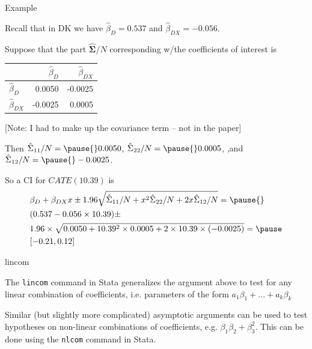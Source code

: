 \documentclass[11pt,english,handout]{beamer}
\newenvironment{wideitemize}{\itemize\addtolength{\itemsep}{10pt}}{\enditemize}
\begin{document}
\begin{frame}{Example}
\begin{wideitemize}
\item
Recall that in DK we have $\hat\beta_D = 0.537$ and $\hat\beta_{DX} = -0.056$.

\item
Suppose that the part $\bm{\hat\Sigma}/N$ corresponding w/the coefficients of interest is

\begin{tabular}{l|rr}
& $\hat\beta_{D}$ & $\hat\beta_{DX}$ \\ \hline 
$\hat\beta_{D}$  & 0.0050  & -0.0025 \\
$\hat\beta_{DX}$ & -0.0025 & 0.0005
\end{tabular}
 
[Note: I had to make up the covariance term -- not in the paper] 
 
 \pause
 \item
 Then $\hat\Sigma_{11}/N = \pause{} 0.0050$, \pause $\hat\Sigma_{22}/N = \pause{} 0.0005$, \pause ,and $\hat\Sigma_{12}/N = \pause{} -0.0025$.
 
 \pause
 \item
 So a CI for $CATE(10.39)$ is \pause{}
\begin{align*}
&\beta_{D} + \beta_{DX} x \pm  1.96 \sqrt{ \hat\Sigma_{11}/N + x^2 \hat\Sigma_{22}/N +   2x \hat\Sigma_{12}/N } = \pause{} \\
&(0.537-0.056 \times 10.39) \pm \\ &1.96 \times \sqrt{  0.0050 + 10.39^2 \times 0.0005 + 2 \times 10.39 \times (-0.0025)  } = \pause \\
&[-0.21, 0.12]
\end{align*} 
 
\end{wideitemize}	
	
\end{frame}


\begin{frame}{lincom}
	\begin{wideitemize}
		\item
		The \texttt{lincom} command in Stata generalizes the argument above to test for any linear combination of coefficients, i.e. parameters of the form $a_1 \beta_1 + ...+ a_k \beta_k$
		

		\pause
		\item
		Similar (but slightly more complicated) asymptotic arguments can be used to test hypotheses on non-linear combinations of coefficients, e.g. $\beta_1 \beta_2 + \beta_3^2$. This can be done using the \texttt{nlcom} command in Stata.
	\end{wideitemize}
\end{frame}
\end{document}

